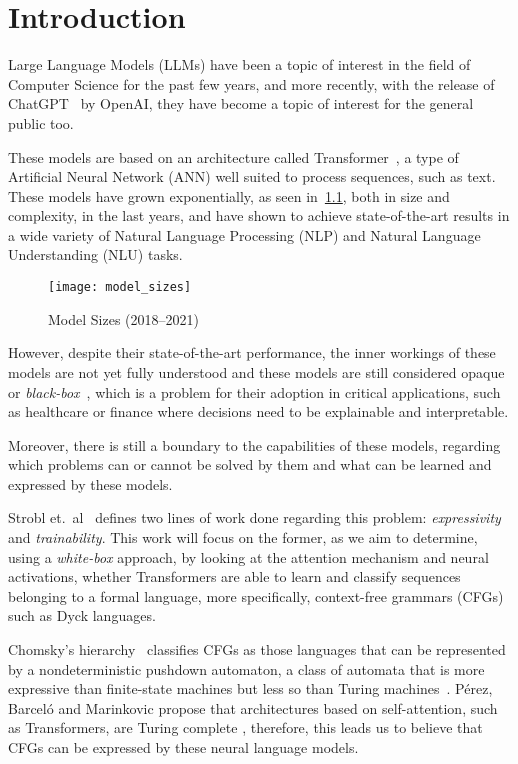 \chapter{Introduction}

Large Language Models (LLMs) have been a topic of interest in the field of Computer Science for the past few years, and more recently, with the release of ChatGPT~\cite{chatgpt} by OpenAI, they have become a topic of interest for the general public too. 

These models are based on an architecture called Transformer~\cite{attention_is_all_you_need}, a type of Artificial Neural Network (ANN) 
well suited to process sequences, such as text. These models have grown exponentially, as seen in~\ref{fig:model_sizes}, both in size and complexity, in the last years, and 
have shown to achieve state-of-the-art results in a wide variety of Natural Language Processing (NLP) and Natural Language Understanding (NLU) tasks.

\begin{figure}[H]
    \centering
    \texttt{[image: model\_sizes]}
    \caption{Model Sizes (2018--2021)~\cite{model_sizes}}
    \label{fig:model_sizes}
\end{figure}

However, despite their state-of-the-art performance, the inner workings of these models are not yet fully understood and these models are still considered opaque or \emph{black-box}~\cite{lei-etal-2016-rationalizing}, which is a problem for their adoption in critical applications, such as healthcare or finance where decisions need to be explainable and interpretable. 

Moreover, there is still a boundary to the capabilities of these models, regarding which problems can or cannot be solved by them and what can be learned and expressed by these models.

Strobl et.\ al\ \cite{strobl2024formal} defines two lines of work done regarding this problem: \textit{expressivity} and \textit{trainability}. This work will focus on the former, as we aim to determine, using a \textit{white-box} approach, by looking at the attention mechanism and neural activations, whether Transformers are able to learn and classify sequences belonging to a formal language, more specifically, context-free grammars (CFGs) such as Dyck languages.

Chomsky's hierarchy\ \cite{chomsky-hierarchy} classifies CFGs as those languages that can be represented by a nondeterministic pushdown automaton, a class of automata that is more expressive than finite-state machines but less so than Turing machines~\cite{context-free-chomsky}. Pérez, Barceló and Marinkovic propose that architectures based on self-attention, such as Transformers, are Turing complete \cite{attention-tc}, therefore, this leads us to believe that CFGs can be expressed by these neural language models.

